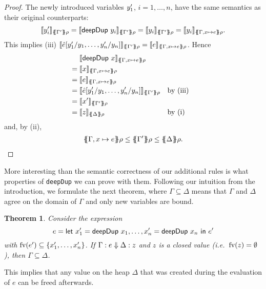 \documentclass[preprint]{sigplanconf}
\newtheorem{theorem}{Theorem}
\theoremstyle{nonumberplain}
\newtheorem{proof}{Proof}
\newcommand{\li}{\lstinline[style=Haskell]}
\begin{document}
\begin{proof}
The newly introduced variables $y'_1$, $i=1,\ldots,n$, have the same semantics as their original counterparts:
\[
\dsem{\fresh y_i}{\esem{\Gamma'}\rho}
= \dsem{\sDeepDup {y_i}}{\esem{\Gamma'}\rho}
= \dsem{y_i}{\esem{\Gamma'}\rho}
= \dsem{y_i}{\esem{\Gamma, x\mapsto e}\rho}.
\]
This implies (iii) $\dsem{\hat e[\fresh y_1/y_1,\ldots,\fresh y_n/y_n]}{\esem{\Gamma'}\rho} = \dsem{e}{\esem{\Gamma, x\mapsto e}\rho}$. Hence
\begin{align*}
&\phantom{{}={}}\dsem{\sDeepDup x}{\esem{\Gamma, x\mapsto e}\rho}\\
&= \dsem{x}{\esem{\Gamma, x\mapsto e}\rho}\\
&= \dsem{e}{\esem{\Gamma, x\mapsto e}\rho}\\
&= \dsem{\hat e[\fresh y_1/y_1,\ldots,\fresh y_n/y_n]}{\esem{\Gamma'}\rho} &&\text{by (iii)}\\
&= \dsem{\fresh x}{\esem{\Gamma'}\rho}\\
&= \dsem{z}{\esem \Delta \rho} &&\text{by (i)}
\end{align*}
and, by (ii),
\begin{align*}
\esem{\Gamma, x\mapsto e}\rho \le \esem{\Gamma'} \rho \le \esem{\Delta}\rho.
\end{align*}
\end{proof}

More interesting than the semantic correctness of our additional rules is what properties of \li-deepDup- we can prove with them. Following our intuition from the introduction, we formulate the next theorem, where $\Gamma \subseteq \Delta$ means that $\Gamma$ and $\Delta$ agree on the domain of $\Gamma$ and only new variables are bound.

\begin{theorem}
Consider the expression
\[
e=\text{\textsf{let}}\ x_1' = \text{\textsf{deepDup}}\ x_1,\ldots,x_n'= \text{\textsf{deepDup}}\ x_n\ \text{\textsf{in}}\ e'
\]
with $\text{fv}(e') \subseteq \{x_1',\ldots,x_n'\}$. If $\Gamma : e \Downarrow \Delta : z$ and $z$ is a closed value (i.e.\ $\text{fv}(z) = \emptyset$), then $\Gamma \subseteq \Delta$.
\label{thm:deepdup}
\end{theorem}
This implies that any value on the heap $\Delta$ that was created during the evaluation of $e$ can be freed afterwards.
\end{document}

